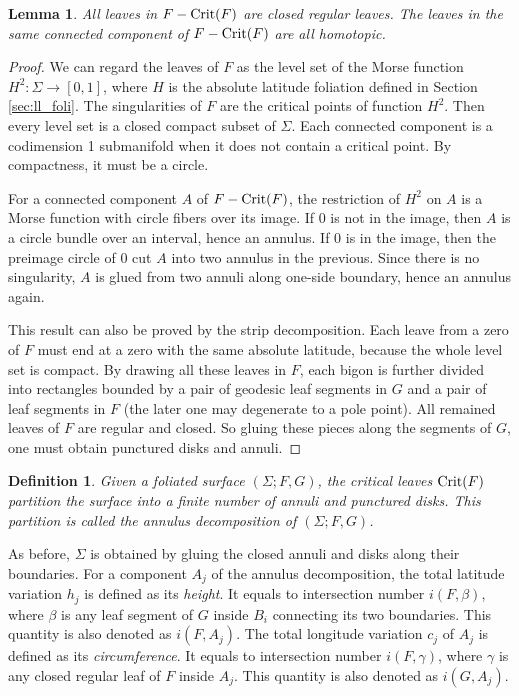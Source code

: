 \documentclass[pdflatex,sn-mathphys]{sn-jnl}%
\numberwithin{equation}{section}
\theoremstyle{thmstyleone}%
\newtheorem{definition}[theorem]{Definition}
\newtheorem{lemma}[theorem]{Lemma}
\newcommand{\DEF}{\emph}
\begin{document}
\begin{lemma}
    All leaves in $F-\mathrm{Crit}(F)$ are closed regular leaves. The leaves in the same connected component of $F-\mathrm{Crit}(F)$ are all homotopic. %
\end{lemma}
\begin{proof}
    We can regard the leaves of $F$ as the level set of the Morse function $H^2:\Sigma\to[0,1]$, where $H$ is the absolute latitude foliation defined in Section \ref{sec:ll_foli}. The singularities of $F$ are the critical points of function $H^2$. Then every level set is a closed compact subset of $\Sigma$. Each connected component is a codimension 1 submanifold when it does not contain a critical point. By compactness, it must be a circle.

    For a connected component $A$ of $F-\mathrm{Crit}(F)$, the restriction of $H^2$ on $A$ is a Morse function with circle fibers over its image. If $0$ is not in the image, then $A$ is a circle bundle over an interval, hence an annulus. If $0$ is in the image, then the preimage circle of $0$ cut $A$ into two annulus in the previous. Since there is no singularity, $A$ is glued from two annuli along one-side boundary, hence an annulus again.

    This result can also be proved by the strip decomposition. Each leave from a zero of $F$ must end at a zero with the same absolute latitude, because the whole level set is compact. By drawing all these leaves in $F$, each bigon is further divided into rectangles bounded by a pair of geodesic leaf segments in $G$ and a pair of leaf segments in $F$ (the later one may degenerate to a pole point). All remained leaves of $F$ are regular and closed. So gluing these pieces along the segments of $G$, one must obtain punctured disks and annuli.
\end{proof}

\begin{definition}\label{def:ann_decomp}
    Given a foliated surface $(\Sigma;F,G)$, the critical leaves $\mathrm{Crit}(F)$ partition the surface into a finite number of annuli and punctured disks. This partition is called the \DEF{annulus decomposition} of $(\Sigma;F,G)$.
\end{definition}

As before, $\Sigma$ is obtained by gluing the closed annuli and disks along their boundaries. For a component $A_j$ of the annulus decomposition, the total latitude variation $h_j$ is defined as its \DEF{height}. It equals to intersection number $i(F,\beta)$, where $\beta$ is any leaf segment of $G$ inside $B_i$ connecting its two boundaries. This quantity is also denoted as $i(F, A_j)$.
The total longitude variation $c_j$ of $A_j$ is defined as its \DEF{circumference}. It equals to intersection number $i(F,\gamma)$, where $\gamma$ is any closed regular leaf of $F$ inside $A_j$. This quantity is also denoted as $i(G, A_j)$.
\end{document}
